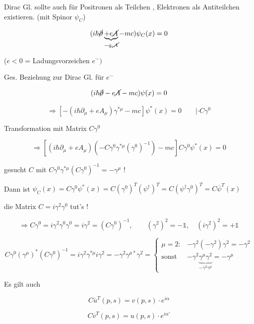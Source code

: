 Dirac Gl. sollte auch für Positronen als Teilchen , Elektronen als Antiteilchen existieren. (mit Spinor \(\psi_C\))

\[(i\hbar \cancel \partial\underbrace{+e\cancel A}_{-q_e\cancel A}-mc)\psi_C(x) = 0\]

(\(e< 0\) = Ladungsvorzeichen \(e^-)\)

Ges. Beziehung zur Dirac Gl. für \(e^-\)

\[ (i\hbar\cancel \partial - e\cancel A - mc)\psi(x) = 0 \]

\[\Rightarrow [-(i\hbar\partial_\mu+eA_\mu)\gamma^{*\mu} - mc]\psi^*(x) = 0\qquad |\cdot C\gamma^0\]

Transformation mit Matrix \(C\gamma^0\)

\[\Rightarrow  [(i\hbar\partial_\mu+eA_\mu)(-C\gamma^0\gamma^{*\mu}(\gamma^0)^{-1}) - mc]C\gamma^0\psi^*(x) = 0  \]


gesucht \(C\) mit \( C\gamma^0\gamma^{*\mu} (C\gamma^0)^{-1} = -\gamma^\mu\) !

Dann ist \(\psi_C (x) = C\gamma^0\psi^*(x) = C(\gamma^0)^T(\psi^\dagger)^T = C(\psi^\dagger\gamma^0)^T = C\overline \psi^T(x)\)

die Matrix \(C=i\gamma^2\gamma^0\) tut's !

\[\Rightarrow C\gamma^0 = i\gamma^2\gamma^0\gamma^0 = i\gamma^2 = (C\gamma^0)^{-1},\qquad (\gamma^2)^2 = -\mathbb 1, \quad (i\gamma^2)^2 = +\mathbb 1\]

\[C\gamma^0(\gamma^\mu)^*(C\gamma^0)^{-1} = i\gamma^2\gamma^{*\mu}i\gamma^2 = -\gamma^2\gamma^{\mu*}\gamma^2 = \begin{cases}
  \mu = 2:  & -\gamma^2(-\gamma^2)\gamma^2 = -\gamma^2\\
  \text{sonst }&-\gamma^2\underbrace{\gamma^\mu\gamma^2}_{-\gamma^2\gamma^\mu} = -\gamma^\mu
\end{cases}\]

Es gilt auch

\[C\overline u^T (p,s) = v(p,s) \cdot e^{i\alpha}\]

\[C\overline v^T (p,s) = u(p,s) \cdot e^{i\alpha'}\]


